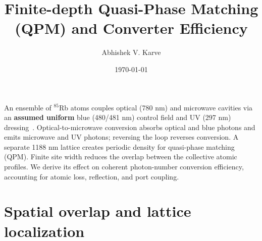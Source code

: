 \documentclass[aps,pra,onecolumn,10pt,letterpaper,notitlepage,nofootinbib,amsmath,amssymb]{revtex4-2}
\begin{document}
\title{Finite-depth Quasi-Phase Matching (QPM) and Converter Efficiency}
\author{Abhishek V. Karve}
\date{\today}
\maketitle

An ensemble of $^{85}$Rb atoms couples optical (780 nm) and microwave cavities
via an \textbf{assumed uniform} blue (480/481 nm) control field and UV (297 nm) dressing~\cite{kumar}.
Optical-to-microwave conversion absorbs optical and blue photons and emits
microwave and UV photons; reversing the loop reverses conversion.
A separate 1188 nm lattice creates periodic density for quasi-phase
matching (QPM). Finite site width reduces the overlap between the collective
atomic profiles. We derive its effect on coherent photon-number conversion
efficiency, accounting for atomic loss, reflection, and port coupling.

\section{Spatial overlap and lattice localization}
\label{sec:qpm}
\end{document}

